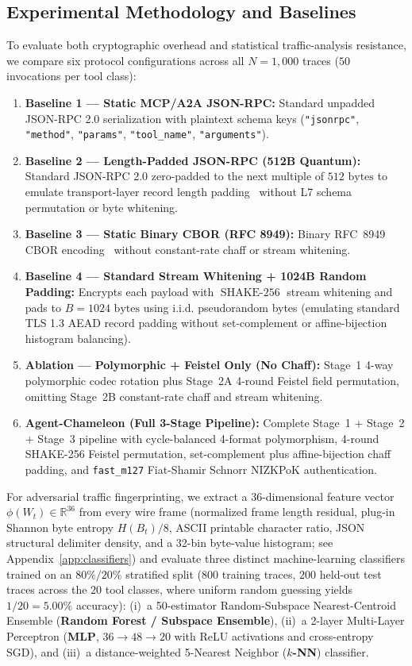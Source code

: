 \documentclass[conference,10pt]{IEEEtran}
\begin{document}
\subsection{Experimental Methodology and Baselines}
To evaluate both cryptographic overhead and statistical traffic-analysis resistance, we compare six protocol configurations across all $N = 1{,}000$ traces ($50$ invocations per tool class):
\begin{enumerate}
    \item \textbf{Baseline 1 --- Static MCP/A2A JSON-RPC:} Standard unpadded JSON-RPC 2.0 serialization with plaintext schema keys (\texttt{"jsonrpc"}, \texttt{"method"}, \texttt{"params"}, \texttt{"tool\_name"}, \texttt{"arguments"}).
    \item \textbf{Baseline 2 --- Length-Padded JSON-RPC (512B Quantum):} Standard JSON-RPC 2.0 zero-padded to the next multiple of $512\text{ bytes}$ to emulate transport-layer record length padding~\cite{rescorla2018tls13, wright2009traffic} without L7 schema permutation or byte whitening.
    \item \textbf{Baseline 3 --- Static Binary CBOR (RFC 8949):} Binary RFC~8949 CBOR encoding~\cite{bormann2020cbor} without constant-rate chaff or stream whitening.
    \item \textbf{Baseline 4 --- Standard Stream Whitening + 1024B Random Padding:} Encrypts each payload with $\operatorname{SHAKE-256}$ stream whitening and pads to $B = 1024\text{ bytes}$ using i.i.d. pseudorandom bytes (emulating standard TLS 1.3 AEAD record padding without set-complement or affine-bijection histogram balancing).
    \item \textbf{Ablation --- Polymorphic + Feistel Only (No Chaff):} Stage~1 4-way polymorphic codec rotation plus Stage~2A 4-round Feistel field permutation, omitting Stage~2B constant-rate chaff and stream whitening.
    \item \textbf{Agent-Chameleon (Full 3-Stage Pipeline):} Complete Stage~1 + Stage~2 + Stage~3 pipeline with cycle-balanced 4-format polymorphism, 4-round SHAKE-256 Feistel permutation, set-complement plus affine-bijection chaff padding, and \texttt{fast\_m127} Fiat-Shamir Schnorr NIZKPoK authentication.
\end{enumerate}

For adversarial traffic fingerprinting, we extract a 36-dimensional feature vector $\phi(W_t) \in \mathbb{R}^{36}$ from every wire frame (normalized frame length residual, plug-in Shannon byte entropy $H(B_t)/8$, ASCII printable character ratio, JSON structural delimiter density, and a 32-bin byte-value histogram; see Appendix~\ref{app:classifiers}) and evaluate three distinct machine-learning classifiers trained on an $80\%/20\%$ stratified split ($800$ training traces, $200$ held-out test traces across the $20$ tool classes, where uniform random guessing yields $1/20 = 5.00\%$ accuracy): (i)~a 50-estimator Random-Subspace Nearest-Centroid Ensemble (\textbf{Random Forest / Subspace Ensemble}), (ii)~a 2-layer Multi-Layer Perceptron (\textbf{MLP}, $36 \to 48 \to 20$ with ReLU activations and cross-entropy SGD), and (iii)~a distance-weighted 5-Nearest Neighbor (\textbf{$k$-NN}) classifier.
\end{document}
